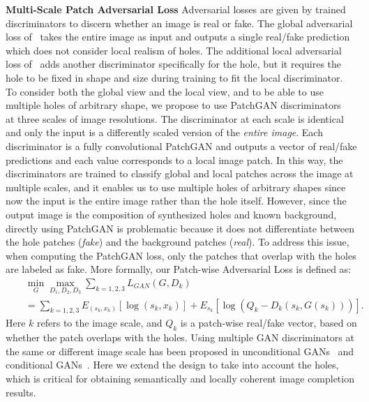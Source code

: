 \noindent\textbf{Multi-Scale Patch Adversarial Loss} Adversarial losses are given by trained discriminators to discern whether an image is real or fake. The global adversarial loss of~\cite{pathak2016context} takes the entire image as input and outputs a single real/fake prediction which does not consider local realism of holes. The additional local adversarial loss of~\cite{iizuka2017globally} adds another discriminator specifically for the hole, but it requires the hole to be fixed in shape and size during training to fit the local discriminator. To consider both the global view and the local view, and to be able to use multiple holes of arbitrary shape, we propose to use PatchGAN discriminators~\cite{isola2016image} at three scales of image resolutions. The discriminator at each scale is identical and only the input is a differently scaled version of the \textit{entire image}. Each discriminator is a fully convolutional PatchGAN and outputs a vector of real/fake predictions and each value corresponds to a local image patch. In this way, the discriminators are trained to classify global and local patches across the image at multiple scales, and it enables us to use multiple holes of arbitrary shapes since now the input is the entire image rather than the hole itself. However, since the output image is the composition of synthesized holes and known background, directly using PatchGAN is problematic because it does not differentiate between the hole patches (\textit{fake}) and the background patches (\textit{real}). To address this issue, when computing the PatchGAN loss, only the patches that overlap with the holes are labeled as fake. More formally, our Patch-wise Adversarial Loss is defined as: 
\begin{eqnarray}
&&\min\limits_G\max\limits_{D_1, D_2, D_3}\sum\limits_{k=1,2,3} L_{GAN}(G,D_k)  \\ \nonumber
&&=\sum\limits_{k=1,2,3}E_{(s_k,x_k)}[\log (s_k,x_k)] + E_{s_k}[\log (Q_k-D_k(s_k,G(s_k)))].
\end{eqnarray}
\label{eqn:adversarial_loss}
Here $k$ refers to the image scale, and $Q_k$ is a patch-wise real/fake vector, based on whether the patch overlaps with the holes. Using multiple GAN discriminators at the same or different image scale has been proposed in unconditional GANs~\cite{durugkar2016generative} and conditional GANs~\cite{wang2017high}. Here we extend the design to take into account the holes, which is critical for obtaining semantically and locally coherent image completion results.

